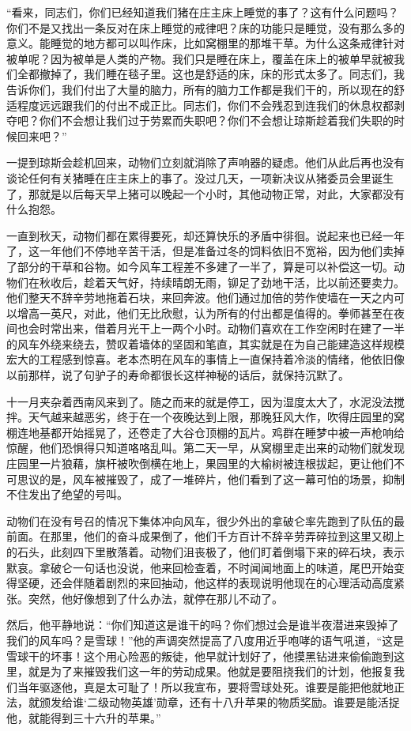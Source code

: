 “看来，同志们，你们已经知道我们猪在庄主床上睡觉的事了？这有什么问题吗？你们不是又找出一条反对在床上睡觉的戒律吧？床的功能只是睡觉，没有那么多的意义。能睡觉的地方都可以叫作床，比如窝棚里的那堆干草。为什么这条戒律针对被单呢？因为被单是人类的产物。我们只是睡在床上，覆盖在床上的被单早就被我们全都撤掉了，我们睡在毯子里。这也是舒适的床，床的形式太多了。同志们，我告诉你们，我们付出了大量的脑力，所有的脑力工作都是我们干的，所以现在的舒适程度远远跟我们的付出不成正比。同志们，你们不会残忍到连我们的休息权都剥夺吧？你们不会想让我们过于劳累而失职吧？你们不会想让琼斯趁着我们失职的时候回来吧？”

一提到琼斯会趁机回来，动物们立刻就消除了声响器的疑虑。他们从此后再也没有谈论任何有关猪睡在庄主床上的事了。没过几天，一项新决议从猪委员会里诞生了，那就是以后每天早上猪可以晚起一个小时，其他动物正常，对此，大家都没有什么抱怨。

一直到秋天，动物们都在累得要死，却还算快乐的矛盾中徘徊。说起来也已经一年了，这一年他们不停地辛苦干活，但是准备过冬的饲料依旧不宽裕，因为他们卖掉了部分的干草和谷物。如今风车工程差不多建了一半了，算是可以补偿这一切。动物们在秋收后，趁着天气好，持续晴朗无雨，铆足了劲地干活，比以前还要卖力。他们整天不辞辛劳地拖着石块，来回奔波。他们通过加倍的劳作使墙在一天之内可以增高一英尺，对此，他们无比欣慰，认为所有的付出都是值得的。拳师甚至在夜间也会时常出来，借着月光干上一两个小时。动物们喜欢在工作空闲时在建了一半的风车外绕来绕去，赞叹着墙体的坚固和笔直，其实就是在为自己能建造这样规模宏大的工程感到惊喜。老本杰明在风车的事情上一直保持着冷淡的情绪，他依旧像以前那样，说了句驴子的寿命都很长这样神秘的话后，就保持沉默了。

十一月夹杂着西南风来到了。随之而来的就是停工，因为湿度太大了，水泥没法搅拌。天气越来越恶劣，终于在一个夜晚达到上限，那晚狂风大作，吹得庄园里的窝棚连地基都开始摇晃了，还卷走了大谷仓顶棚的瓦片。鸡群在睡梦中被一声枪响给惊醒，他们恐惧得只知道咯咯乱叫。第二天一早，从窝棚里走出来的动物们就发现庄园里一片狼藉，旗杆被吹倒横在地上，果园里的大榆树被连根拔起，更让他们不可思议的是，风车被摧毁了，成了一堆碎片，他们看到了这一幕可怕的场景，抑制不住发出了绝望的号叫。

动物们在没有号召的情况下集体冲向风车，很少外出的拿破仑率先跑到了队伍的最前面。在那里，他们的奋斗成果倒了，他们千方百计不辞辛劳弄碎拉到这里又砌上的石头，此刻四下里散落着。动物们沮丧极了，他们盯着倒塌下来的碎石块，表示默哀。拿破仑一句话也没说，他来回检查着，不时闻闻地面上的味道，尾巴开始变得坚硬，还会伴随着剧烈的来回抽动，他这样的表现说明他现在的心理活动高度紧张。突然，他好像想到了什么办法，就停在那儿不动了。

然后，他平静地说：“你们知道这是谁干的吗？你们想过会是谁半夜潜进来毁掉了我们的风车吗？是雪球！”他的声调突然提高了八度用近乎咆哮的语气吼道，“这是雪球干的坏事！这个用心险恶的叛徒，他早就计划好了，他摸黑钻进来偷偷跑到这里，就是为了来摧毁我们这一年的劳动成果。他就是要阻挠我们的计划，他报复我们当年驱逐他，真是太可耻了！所以我宣布，要将雪球处死。谁要是能把他就地正法，就颁发给谁‘二级动物英雄’勋章，还有十八升苹果的物质奖励。谁要是能活捉他，就能得到三十六升的苹果。”

